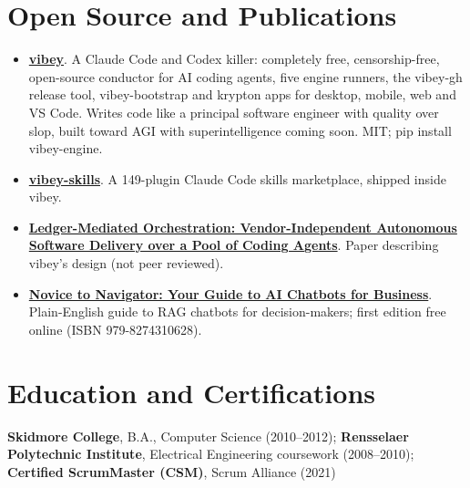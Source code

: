 \documentclass[10pt,letterpaper]{article}
\newcommand{\szmeta}{\fontsize{8pt}{10pt}\selectfont}
\begin{document}
\section*{Open Source and Publications}\begin{itemize}
\item \textbf{\href{https://github.com/the-vibey-project/vibey}{vibey}}. A Claude Code and Codex killer: completely free, censorship-free, open-source conductor for AI coding agents, five engine runners, the vibey-gh release tool, vibey-bootstrap and krypton apps for desktop, mobile, web and VS Code. Writes code like a principal software engineer with quality over slop, built toward AGI with superintelligence coming soon. MIT; pip install vibey-engine.
\item \textbf{\href{https://github.com/the-vibey-project/vibey}{vibey-skills}}. A 149-plugin Claude Code skills marketplace, shipped inside vibey.
\item \textbf{\href{https://the-vibey-project.github.io/vibey/main/paper.pdf}{Ledger-Mediated Orchestration: Vendor-Independent Autonomous Software Delivery over a Pool of Coding Agents}}. Paper describing vibey's design (not peer reviewed).
\item \textbf{\href{https://vibewithadam.matthewsteinberger.com/novice-to-navigator}{Novice to Navigator: Your Guide to AI Chatbots for Business}}. Plain-English guide to RAG chatbots for decision-makers; first edition free online (ISBN 979-8274310628).
\end{itemize}
\section*{Education and Certifications}
{\szmeta \textbf{Skidmore College}, B.A., Computer Science {\color{muted}(2010--2012)}; \textbf{Rensselaer Polytechnic Institute}, Electrical Engineering coursework {\color{muted}(2008--2010)}; \textbf{Certified ScrumMaster (CSM)}, Scrum Alliance {\color{muted}(2021)}}\par
\end{document}
